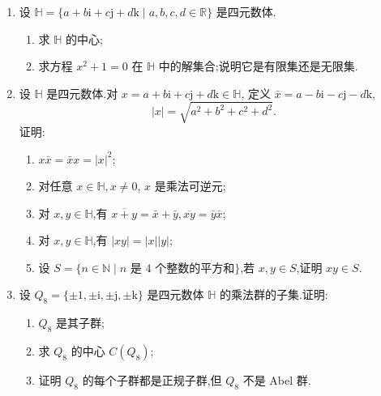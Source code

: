 \begin{enumerate}
\begin{proof}
\begin{enumerate}[label=(\arabic*)]
        反之,若$N(x)=\pm1$,设$x=a+b\sqrt{2}$,则$a^2-2b^2=\pm 1$,
        于是$(a+b\sqrt{2})(a-b\sqrt{2})=\pm 1$,
        所以$x^{-1}=\pm (a-b\sqrt{2})\in A$,即$x$可逆.
        \item 只需证Pell方程$a^2-2b^2=1$有无限多组整数解即可,
        事实上,固定一组解非平凡解$(a,b)$ (例如$(3,2)$),
        有$(a + b\sqrt{2})(a - b\sqrt{2})=1$,两边平方,得到
        $$1=(a + b\sqrt{2})^2(a - b\sqrt{2})^2=(a^2+2b^2)^2-2(2ab)^2$$
        从而得到一组新的解$(a^2+2b^2,2ab)$,重复下去即可得到无限多组解.
              
        注：对于数域（即$\mathbb{Q}$的有限扩张$K$）的整数环
        （即$\mathcal{O}_K=\{\alpha \in K\mid\alpha\text{ 是某个整系数多项式的根}\}$）
        的单位群的结构的更为一般的刻画称为Dirichlet单位定理，可参考\cite{FeK}第三章\S\,2.\qedhere
    \end{enumerate}
\end{proof}

\item 设 $\mathbb{H} = \{a + b\mathrm{i} + c\mathrm{j} + d\mathrm{k} \mid a, b, c, d \in \mathbb{R}\}$ 是四元数体.
\begin{enumerate}[label=(\arabic*)]
    \item 求 $\mathbb{H}$ 的中心;
    \item 求方程 $x^2 + 1 = 0$ 在 $\mathbb{H}$ 中的解集合;说明它是有限集还是无限集.
\end{enumerate}

\item 设 $\mathbb{H}$ 是四元数体.对 $x = a + b\mathrm{i} + c\mathrm{j} + d\mathrm{k} \in \mathbb{H}$,
定义 $\bar{x} = a - b\mathrm{i} - c\mathrm{j} - d\mathrm{k}$,
\[|x| = \sqrt{a^2 + b^2 + c^2 + d^2}.\]证明:
\begin{enumerate}[label=(\arabic*)]
    \item $x\bar{x} = \bar{x}x = |x|^2$;
    \item 对任意 $x \in \mathbb{H}, x \neq 0$, $x$ 是乘法可逆元;
    \item 对 $x, y \in \mathbb{H}$,有 $\overline{x + y} = \bar{x} + \bar{y}, \overline{xy} = \bar{y}\bar{x}$;
    \item 对 $x, y \in \mathbb{H}$,有 $|xy| = |x||y|$;
    \item 设 $S = \{n \in \mathbb{N} \mid n \text{ 是 } 4 \text{ 个整数的平方和}\}$,若 $x, y \in S$,证明 $xy \in S$.
\end{enumerate}

\item 设 $Q_8 = \{\pm 1, \pm \mathrm{i}, \pm \mathrm{j}, \pm \mathrm{k}\}$ 是四元数体 $\mathbb{H}$ 的乘法群的子集.证明:
\begin{enumerate}[label=(\arabic*)]
    \item $Q_8$ 是其子群;
    \item 求 $Q_8$ 的中心 $C(Q_8)$;
    \item 证明 $Q_8$ 的每个子群都是正规子群,但 $Q_8$ 不是 Abel 群.
\end{enumerate}


\end{enumerate}
